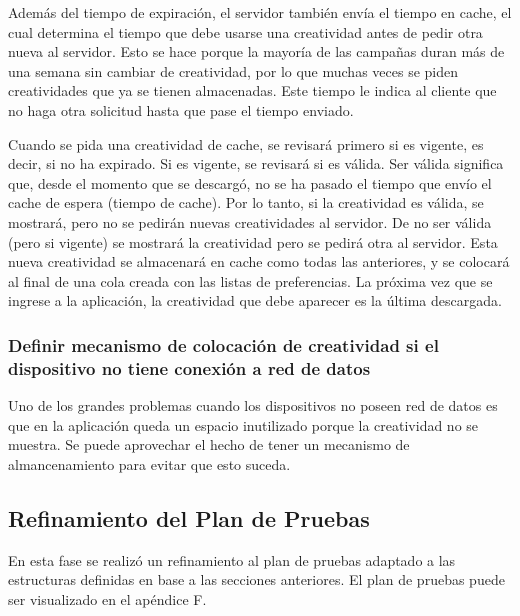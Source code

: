 Además del tiempo de expiración, el servidor también envía el tiempo
en cache, el cual determina el tiempo que debe usarse una creatividad
antes de pedir otra nueva al servidor. Esto se hace porque la mayoría
de las campañas duran más de una semana sin cambiar de creatividad,
por lo que muchas veces se piden creatividades que ya se tienen almacenadas.
Este tiempo le indica al cliente que no haga otra solicitud hasta
que pase el tiempo enviado. 

Cuando se pida una creatividad de cache, se revisará primero si es
vigente, es decir, si no ha expirado. Si es vigente, se revisará si
es válida. Ser válida significa que, desde el momento que se descargó,
no se ha pasado el tiempo que envío el cache de espera (tiempo de
cache). Por lo tanto, si la creatividad es válida, se mostrará, pero
no se pedirán nuevas creatividades al servidor. De no ser válida (pero
si vigente) se mostrará la creatividad pero se pedirá otra al servidor.
Esta nueva creatividad se almacenará en cache como todas las anteriores,
y se colocará al final de una cola creada con las listas de preferencias.
La próxima vez que se ingrese a la aplicación, la creatividad que
debe aparecer es la última descargada.

\begin{figure}[h]
\centering{}%
\end{figure}



\subsubsection{Definir mecanismo de colocación de creatividad si el dispositivo
no tiene conexión a red de datos}

Uno de los grandes problemas cuando los dispositivos no poseen red
de datos es que en la aplicación queda un espacio inutilizado porque
la creatividad no se muestra. Se puede aprovechar el hecho de tener
un mecanismo de almancenamiento para evitar que esto suceda.


\subsection{Refinamiento del Plan de Pruebas}

En esta fase se realizó un refinamiento al plan de pruebas adaptado
a las estructuras definidas en base a las secciones anteriores. El
plan de pruebas puede ser visualizado en el apéndice F.



